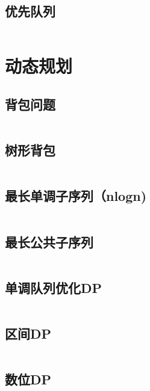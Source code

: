\inputminted{cpp}{code/set_symmetric_difference.cc}

\subsection{优先队列} 

\inputminted{cpp}{code/priority_queue.cc}

\newpage\section{动态规划} 
\subsection{背包问题} 

\inputminted{cpp}{code/背包.cc}

\subsection{树形背包} 

\inputminted{cpp}{code/树形背包.cc}

\subsection{最长单调子序列（nlogn)} 

\inputminted{cpp}{code/LIS(nlogn).cc}

\subsection{最长公共子序列} 

\inputminted{cpp}{code/LCS.cc}

\subsection{单调队列优化DP} 

\inputminted{cpp}{code/单调队列.cc}

\subsection{区间DP} 

\inputminted{cpp}{code/区间DP.cc}

\subsection{数位DP} 

